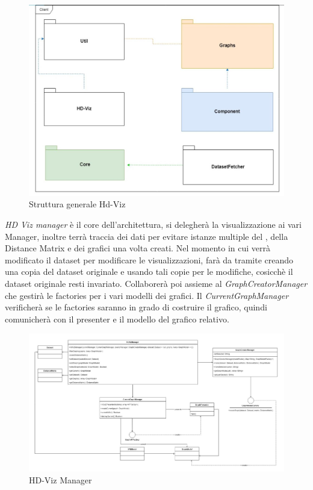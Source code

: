 \documentclass[../manuale_sviluppatore.tex]{subfiles}
\begin{document}
\begin{figure}[H]
	\centering
	\includegraphics[width=18cm]{img/core.jpg}
	\caption{Struttura generale Hd-Viz}
\end{figure}

\emph{HD Viz manager} è il core dell'architettura, si delegherà la visualizzazione ai vari Manager, inoltre terrà traccia 
dei dati per evitare istanze multiple del , della Distance Matrix e dei grafici una volta creati. Nel momento in cui 
verrà modificato il dataset per modificare le visualizzazioni, farà da tramite creando una copia del dataset originale e usando
tali copie per le modifiche, cosicchè il dataset originale resti invariato.
Collaborerà poi assieme al \emph{GraphCreatorManager} che gestirà le factories per i vari modelli dei grafici. 
Il \emph{CurrentGraphManager} verificherà se le factories saranno in grado di costruire il grafico, quindi comunicherà con il 
presenter e il modello del grafico relativo. \\


\begin{figure}[H]
	\centering
	\includegraphics[width=18cm]{img/core-hdvizmanager.jpg}
	\caption{HD-Viz Manager}
\end{figure}
\end{document}
